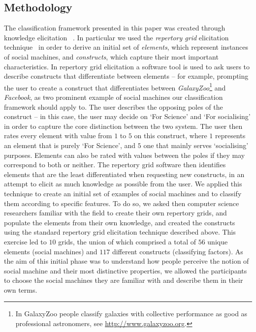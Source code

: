 \documentclass{sig-alternate}
\begin{document}
\subsection{Methodology}
\label{sec:methodology}
The classification framework presented in this paper was created through knowledge elicitation ~\cite{knowledgeelicitation}. In particular we used the {\it repertory grid} elicitation
technique~\cite{kelly} in order to derive an initial set of {\it elements}, which represent instances of social machines, and {\it constructs}, which capture their most important characteristics.
In repertory grid elicitation a software tool is used to ask users to describe constructs
that differentiate between elements -- for example, prompting the user to create a construct that
differentiates between {\it GalaxyZoo}\footnote{In GalaxyZoo people classify galaxies with collective performance as good as professional astronomers, see \url{http://www.galaxyzoo.org}.} and {\it Facebook}, as two prominent example of social machines our classification framework should apply to. The user describes the opposing poles of the construct -- in this case, the user may decide on `For Science' and `For socialising' in order to capture the core distinction between the two system. The user then rates every element with value from $1$ to $5$ on this construct, where $1$ represents an element that is purely
`For Science', and $5$ one that mainly serves `socialising' purposes. Elements can also be rated with values between the poles if they may correspond to both or neither. The repertory grid software then identifies elements that are the least differentiated when requesting new constructs, in an attempt to elicit as much knowledge as possible from the user. We applied this technique to create an initial set of examples of social machines and to classify them according to specific features. To do so, we asked then computer science researchers familiar with the field to create their own repertory grids, and populate the elements from their own knowledge, and created the constructs using the standard repertory grid elicitation technique described above. This exercise led to $10$ grids, the union of which comprised a total of $56$ unique elements (social machines)
and $117$ different constructs (classifying factors). As the aim of this initial phase was to understand how people perceive the notion of social machine and their most distinctive properties, we allowed the participants to choose the social machines they are familiar with and describe them in their own terms.
\end{document}
